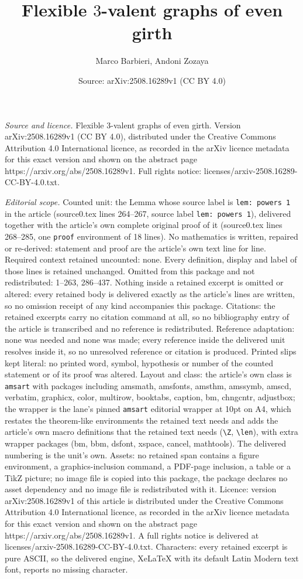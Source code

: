 \documentclass[10pt,a4paper]{amsart}
\title[Flexible $3$-valent graphs of even girth]{Flexible $3$-valent graphs of even girth}
\author{Marco Barbieri, Andoni Zozaya}
\date{Source: arXiv:2508.16289v1 (CC BY 4.0)}
\begin{document}
\maketitle

\noindent\emph{Source and licence.} Flexible $3$-valent graphs of even girth. Version arXiv:2508.16289v1 (CC BY 4.0), distributed under the Creative Commons Attribution 4.0 International licence, as recorded in the arXiv licence metadata for this exact version and shown on the abstract page https://arxiv.org/abs/2508.16289v1. Full rights notice: licenses/arxiv-2508.16289-CC-BY-4.0.txt.\par\smallskip

\noindent\textit{Editorial scope.} Counted unit: the Lemma whose source label is \texttt{lem: powers 1} in the article (source0.tex lines 264--267, source label \texttt{lem: powers 1}), delivered together with the article's own complete original proof of it (source0.tex lines 268--285, one \texttt{proof} environment of 18 lines). No mathematics is written, repaired or re-derived: statement and proof are the article's own text line for line. Required context retained uncounted: none. Every definition, display and label of those lines is retained unchanged. Omitted from this package and not redistributed: 1--263, 286--437. Nothing inside a retained excerpt is omitted or altered: every retained body is delivered exactly as the article's lines are written, so no omission receipt of any kind accompanies this package. Citations: the retained excerpts carry no citation command at all, so no bibliography entry of the article is transcribed and no reference is redistributed. Reference adaptation: none was needed and none was made; every reference inside the delivered unit resolves inside it, so no unresolved reference or citation is produced. Printed slips kept literal: no printed word, symbol, hypothesis or number of the counted statement or of its proof was altered. Layout and class: the article's own class is \texttt{amsart} with packages including amsmath, amsfonts, amsthm, amssymb, amscd, verbatim, graphicx, color, multirow, booktabs, caption, bm, chngcntr, adjustbox; the wrapper is the lane's pinned \texttt{amsart} editorial wrapper at 10pt on A4, which restates the theorem-like environments the retained text needs and adds the article's own macro definitions that the retained text needs (\texttt{\textbackslash Z}, \texttt{\textbackslash len}), with extra wrapper packages (bm, bbm, dsfont, xspace, cancel, mathtools). The delivered numbering is the unit's own. Assets: no retained span contains a figure environment, a graphics-inclusion command, a PDF-page inclusion, a table or a TikZ picture; no image file is copied into this package, the package declares no asset dependency and no image file is redistributed with it. Licence: version arXiv:2508.16289v1 of this article is distributed under the Creative Commons Attribution 4.0 International licence, as recorded in the arXiv licence metadata for this exact version and shown on the abstract page https://arxiv.org/abs/2508.16289v1. A full rights notice is delivered at licenses/arxiv-2508.16289-CC-BY-4.0.txt. Characters: every retained excerpt is pure ASCII, so the delivered engine, XeLaTeX with its default Latin Modern text font, reports no missing character.
\end{document}
